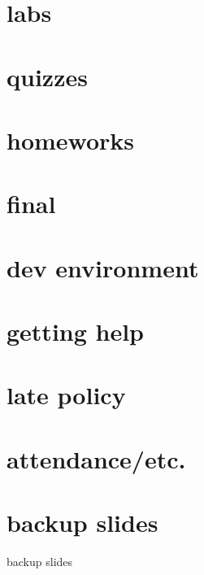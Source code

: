 \date{}
\title{}
\date{}

\begin{frame}
    \titlepage
\end{frame}

\section{labs}


\section{quizzes}


\section{homeworks}


\section{final}


\section{dev environment}


\section{getting help}


\section{late policy}


\section{attendance/etc.}


\section{backup slides}
\begin{frame}{backup slides}
\end{frame}


